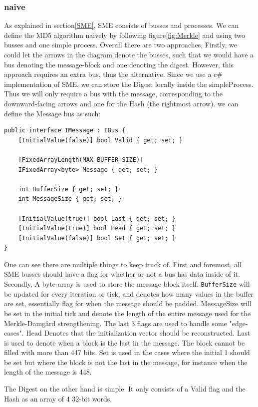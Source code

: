 \documentclass[a4paper]{article}
\begin{document}
\subsubsection{naive}
\label{sec:orgbe29e06}
As explained in section\ref{SME}, SME consists of busses and processes. We can define the MD5 algorithm naively by following figure\ref{fig:Merkle} and using two busses and one simple process. Overall there are two approaches,
Firstly, we could let the arrows in the diagram denote the busses, such that we would have a bus denoting the message-block and one denoting the digest. However, this approach requires an extra bus, thus the alternative. Since we use a c\# implementation of SME, we can store the Digest locally inside the simpleProcess. Thus we will only require a bus with the message, corresponding to the downward-facing arrows and one for the Hash (the rightmost arrow).
we can define the Message bus as such:
\begin{verbatim}
public interface IMessage : IBus {
    [InitialValue(false)] bool Valid { get; set; }

    [FixedArrayLength(MAX_BUFFER_SIZE)]
    IFixedArray<byte> Message { get; set; }

    int BufferSize { get; set; }
    int MessageSize { get; set; }

    [InitialValue(true)] bool Last { get; set; }
    [InitialValue(true)] bool Head { get; set; }
    [InitialValue(false)] bool Set { get; set; }
}
\end{verbatim}
One can see there are multiple things to keep track of. First and foremost, all SME busses should have a flag for whether or not a bus has data inside of it. Secondly, A byte-array is used to store the message block itself. \texttt{BufferSize} will be updated for every iteration or tick, and denotes how many values in the buffer are set, essentially flag for when the message should be padded. MessageSize will be set in the initial tick and denote the length of the entire message used for the Merkle-Damgård strengthening.
The last 3 flags are used to handle some "edge-cases".
Head Denotes that the initialization vector should be reconstructed.
Last is used to denote when a block is the last in the message. The block cannot be filled with more than 447 bits.
Set is used in the cases where the initial 1 should be set but where the block is not the last in the message, for instance when the length of the message is 448.

The Digest on the other hand is simple. It only consists of a Valid flag and the Hash as an array of 4 32-bit words.
\end{document}
